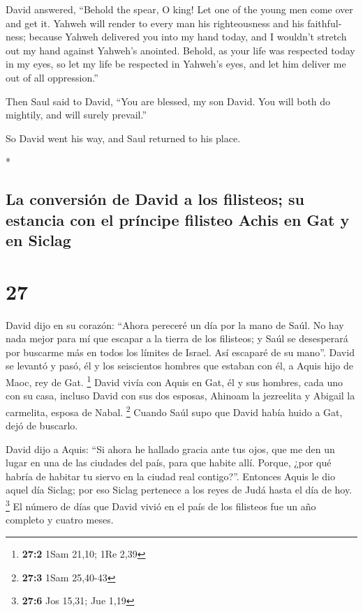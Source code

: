 \begin{paracol}{2}
\begin{otherlanguage}{english}
 David answered, ``Behold the spear, O king! Let one of
the young men come over and get it.  Yahweh will render
to every man his righteousness and his faithfulness; because Yahweh
delivered you into my hand today, and I wouldn't stretch out my hand
against Yahweh's anointed.  Behold, as your life was
respected today in my eyes, so let my life be respected in Yahweh's
eyes, and let him deliver me out of all oppression.''

 Then Saul said to David, ``You are blessed, my son
David. You will both do mightily, and will surely prevail.''

So David went his way, and Saul returned to his place.

\end{otherlanguage}

\switchcolumn[0]*

\hypertarget{la-conversiuxf3n-de-david-a-los-filisteos-su-estancia-con-el-pruxedncipe-filisteo-achis-en-gat-y-en-siclag}{%
\subsection{La conversión de David a los filisteos; su estancia con el
príncipe filisteo Achis en Gat y en
Siclag}\label{la-conversiuxf3n-de-david-a-los-filisteos-su-estancia-con-el-pruxedncipe-filisteo-achis-en-gat-y-en-siclag}}

\hypertarget{section-52}{%
\section{27}\label{section-52}}

 David dijo en su corazón: ``Ahora pereceré un día por la
mano de Saúl. No hay nada mejor para mí que escapar a la tierra de los
filisteos; y Saúl se desesperará por buscarme más en todos los límites
de Israel. Así escaparé de su mano''.  David se levantó y
pasó, él y los seiscientos hombres que estaban con él, a Aquis hijo de
Maoc, rey de Gat. \footnote{\textbf{27:2} 1Sam 21,10; 1Re 2,39}
 David vivía con Aquis en Gat, él y sus hombres, cada uno
con su casa, incluso David con sus dos esposas, Ahinoam la jezreelita y
Abigail la carmelita, esposa de Nabal. \footnote{\textbf{27:3} 1Sam
  25,40-43}  Cuando Saúl supo que David había huido a Gat,
dejó de buscarlo.

 David dijo a Aquis: ``Si ahora he hallado gracia ante tus
ojos, que me den un lugar en una de las ciudades del país, para que
habite allí. Porque, ¿por qué habría de habitar tu siervo en la ciudad
real contigo?''.  Entonces Aquis le dio aquel día Siclag;
por eso Siclag pertenece a los reyes de Judá hasta el día de hoy.
\footnote{\textbf{27:6} Jos 15,31; Jue 1,19}  El número de
días que David vivió en el país de los filisteos fue un año completo y
cuatro meses.


\end{paracol}
